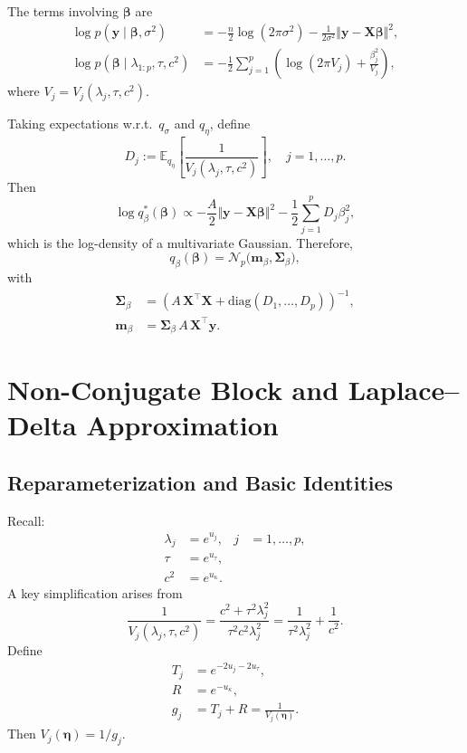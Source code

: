 \documentclass[11pt]{article}
\newcommand{\vect}[1]{\boldsymbol{#1}}
\newcommand{\mat}[1]{\mathbf{#1}}
\newcommand{\E}{\mathbb{E}}
\newcommand{\N}{\mathcal{N}}
\begin{document}
The terms involving $\vect{\beta}$ are
\begin{align}
  \log p(\vect{y} \mid \vect{\beta},\sigma^2)
  &= -\frac{n}{2}\log(2\pi\sigma^2)
     - \frac{1}{2\sigma^2}\Vert \vect{y} - \mat{X}\vect{\beta} \Vert^2,\\
  \log p(\vect{\beta} \mid \lambda_{1:p},\tau,c^2)
  &= -\frac12 \sum_{j=1}^p 
     \left( \log(2\pi V_j) + \frac{\beta_j^2}{V_j} \right),
\end{align}
where $V_j = V_j(\lambda_j,\tau,c^2)$.

Taking expectations w.r.t.\ $q_\sigma$ and $q_\eta$, define
\begin{equation}
  D_j := \E_{q_\eta} \left[\frac{1}{V_j(\lambda_j,\tau,c^2)}\right],
  \quad j=1,\dots,p.
\end{equation}
Then
\begin{equation}
  \log q_\beta^*(\vect{\beta})
  \propto
  -\frac{A}{2}\Vert \vect{y} - \mat{X}\vect{\beta} \Vert^2 
  -\frac12 \sum_{j=1}^p D_j \beta_j^2,
\end{equation}
which is the log-density of a multivariate Gaussian. Therefore,
\begin{equation}
  q_\beta(\vect{\beta})
  = \N_p\big(\vect{m}_\beta, \mat{\Sigma}_\beta\big),
\end{equation}
with
\begin{align}
  \mat{\Sigma}_\beta
  &= \left(
      A\,\mat{X}^\top \mat{X} 
      + \mathrm{diag}(D_1,\dots,D_p)
    \right)^{-1}, \\
  \vect{m}_\beta
  &= \mat{\Sigma}_\beta \, A\, \mat{X}^\top \vect{y}.
\end{align}

\section{Non-Conjugate Block and Laplace--Delta Approximation}

\subsection{Reparameterization and Basic Identities}

Recall:
\begin{align}
  \lambda_j &= e^{u_j},      & j &= 1,\dots,p, \\
  \tau      &= e^{u_\tau}, \\
  c^2       &= e^{u_\kappa}.
\end{align}
A key simplification arises from
\begin{equation}
  \frac{1}{V_j(\lambda_j,\tau,c^2)}
  = \frac{c^2 + \tau^2 \lambda_j^2}{\tau^2 c^2 \lambda_j^2}
  = \frac{1}{\tau^2 \lambda_j^2} + \frac{1}{c^2}.
\end{equation}
Define
\begin{align}
  T_j &= e^{-2u_j - 2u_\tau}, \\
  R   &= e^{-u_\kappa}, \\
  g_j &= T_j + R = \frac{1}{V_j(\boldsymbol{\eta})}.
\end{align}
Then $V_j(\boldsymbol{\eta}) = 1 / g_j$.
\end{document}
